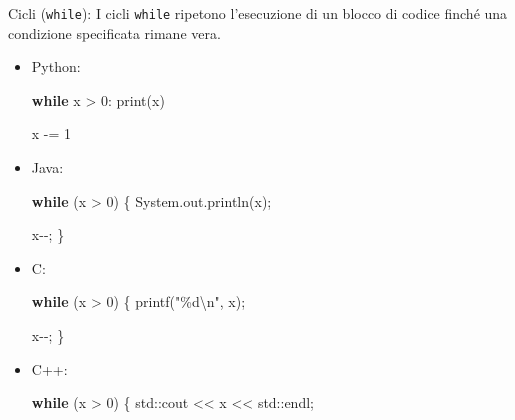 \documentclass[
  letterpaper,
]{scrbook}
\newenvironment{Shaded}{\begin{snugshade}}{\end{snugshade}}
\newcommand{\BuiltInTok}[1]{\textcolor[rgb]{0.00,0.23,0.31}{#1}}
\newcommand{\ControlFlowTok}[1]{\textcolor[rgb]{0.00,0.23,0.31}{\textbf{#1}}}
\newcommand{\DecValTok}[1]{\textcolor[rgb]{0.68,0.00,0.00}{#1}}
\newcommand{\FunctionTok}[1]{\textcolor[rgb]{0.28,0.35,0.67}{#1}}
\newcommand{\NormalTok}[1]{\textcolor[rgb]{0.00,0.23,0.31}{#1}}
\newcommand{\OperatorTok}[1]{\textcolor[rgb]{0.37,0.37,0.37}{#1}}
\newcommand{\SpecialCharTok}[1]{\textcolor[rgb]{0.37,0.37,0.37}{#1}}
\newcommand{\StringTok}[1]{\textcolor[rgb]{0.13,0.47,0.30}{#1}}
\begin{document}
Cicli (\texttt{while}): I cicli \texttt{while} ripetono l'esecuzione di
un blocco di codice finché una condizione specificata rimane vera.

\begin{itemize}
\item
  Python:

\begin{Shaded}
\begin{Highlighting}[]
\ControlFlowTok{while}\NormalTok{ x }\OperatorTok{\textgreater{}} \DecValTok{0}\NormalTok{:}
  \BuiltInTok{print}\NormalTok{(x)}

\NormalTok{  x }\OperatorTok{{-}=} \DecValTok{1}
\end{Highlighting}
\end{Shaded}
\item
  Java:

\begin{Shaded}
\begin{Highlighting}[]
\ControlFlowTok{while} \OperatorTok{(}\NormalTok{x }\OperatorTok{\textgreater{}} \DecValTok{0}\OperatorTok{)} \OperatorTok{\{}
  \BuiltInTok{System}\OperatorTok{.}\FunctionTok{out}\OperatorTok{.}\FunctionTok{println}\OperatorTok{(}\NormalTok{x}\OperatorTok{);}

\NormalTok{  x}\OperatorTok{{-}{-};}
\OperatorTok{\}}
\end{Highlighting}
\end{Shaded}
\item
  C:

\begin{Shaded}
\begin{Highlighting}[]
\ControlFlowTok{while} \OperatorTok{(}\NormalTok{x }\OperatorTok{\textgreater{}} \DecValTok{0}\OperatorTok{)} \OperatorTok{\{}
\NormalTok{  printf}\OperatorTok{(}\StringTok{"}\SpecialCharTok{\%d\textbackslash{}n}\StringTok{"}\OperatorTok{,}\NormalTok{ x}\OperatorTok{);}

\NormalTok{  x}\OperatorTok{{-}{-};}
\OperatorTok{\}}
\end{Highlighting}
\end{Shaded}
\item
  C++:

\begin{Shaded}
\begin{Highlighting}[]
\ControlFlowTok{while} \OperatorTok{(}\NormalTok{x }\OperatorTok{\textgreater{}} \DecValTok{0}\OperatorTok{)} \OperatorTok{\{}
  \BuiltInTok{std::}\NormalTok{cout }\OperatorTok{\textless{}\textless{}}\NormalTok{ x }\OperatorTok{\textless{}\textless{}} \BuiltInTok{std::}\NormalTok{endl}\OperatorTok{;}


\end{Highlighting}
\end{Shaded}
\end{itemize}
\end{document}
